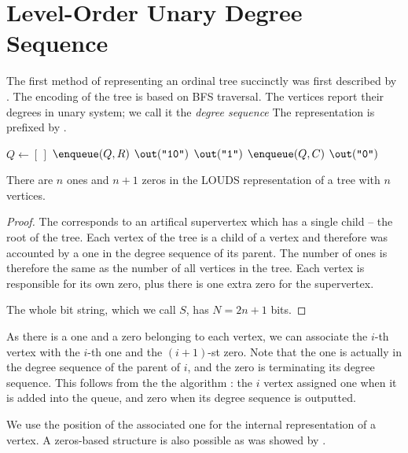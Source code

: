 \section{Level-Order Unary Degree Sequence}

The first method of representing an ordinal tree succinctly was first described by \cite{jacobson1989space}.
The encoding of the tree is based on BFS traversal.
The vertices report their degrees in unary system; we call it the \emph{degree sequence}
The representation is prefixed by .

\begin{algorithm}
\begin{algorithmic}
	\State $Q \gets [\,]$%
	\Instr $\enqueue(Q, R)$ 
	\State $\out(\str{10})$
			\State $\out(\str1)$
			\State $\enqueue(Q, C)$
		\EndFor
		\State $\out(\str0)$
	\EndWhile
\EndFunction
\end{algorithmic}
\end{algorithm}

\begin{lemma}
	There are $n$ ones and $n+1$ zeros in the LOUDS representation of a tree with $n$ vertices.
\end{lemma}
\begin{proof}
	The  corresponds to an artifical supervertex which has a single child -- the root of the tree.
	Each vertex of the tree is a child of a vertex and therefore was accounted by a one in the degree sequence of its parent.
	The number of ones is therefore the same as the number of all vertices in the tree.
	Each vertex is responsible for its own zero, plus there is one extra zero for the supervertex.
	
	The whole bit string, which we call $S$, has $N = 2n + 1$ bits.
\end{proof}

As there is a one and a zero belonging to each vertex, we can associate the $i$-th vertex with the $i$-th one and the $(i+1)$-st zero.
Note that the one is actually in the degree sequence of the parent of $i$, and the zero is terminating its degree sequence.
This follows from the the algorithm \LOUDSRepresentation{}: the $i$ vertex assigned one when it is added into the queue, and zero when its degree sequence is outputted.

We use the position of the associated one for the internal representation of a vertex.
A zeros-based structure is also possible as was showed by \cite{rahman2006engineering}.

